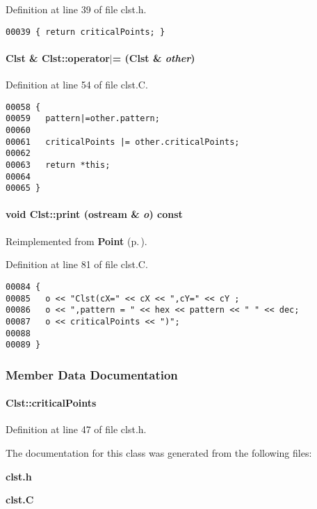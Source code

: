 Definition at line 39 of file clst.h.\small\begin{verbatim}00039 { return criticalPoints; }
\end{verbatim}\normalsize 
\label{Clst_a8}
\paragraph{\setlength{\rightskip}{0pt plus 5cm}Clst \& Clst::operator$|$= (Clst \& {\em other})}\hfill



Definition at line 54 of file clst.C.\small\begin{verbatim}00058 {
00059   pattern|=other.pattern;
00060 
00061   criticalPoints |= other.criticalPoints;
00062 
00063   return *this;
00064 
00065 }
\end{verbatim}\normalsize 
\label{Clst_a5}
\paragraph{\setlength{\rightskip}{0pt plus 5cm}void Clst::print (ostream \& {\em o}) const\hspace{0.3cm}{\tt  [virtual]}}\hfill



Reimplemented from {\bf Point} {\rm (p.\,\pageref{Point_a6})}.

Definition at line 81 of file clst.C.\small\begin{verbatim}00084 {
00085   o << "Clst(cX=" << cX << ",cY=" << cY ;
00086   o << ",pattern = " << hex << pattern << " " << dec;
00087   o << criticalPoints << ")";
00088 
00089 }
\end{verbatim}\normalsize 


\subsubsection{Member Data Documentation}
\label{Clst_m0}
\paragraph{ Clst::critical\-Points}\hfill



Definition at line 47 of file clst.h.

The documentation for this class was generated from the following files:\begin{CompactItemize}
\item 
{\bf clst.h}\item 
{\bf clst.C}\end{CompactItemize}
